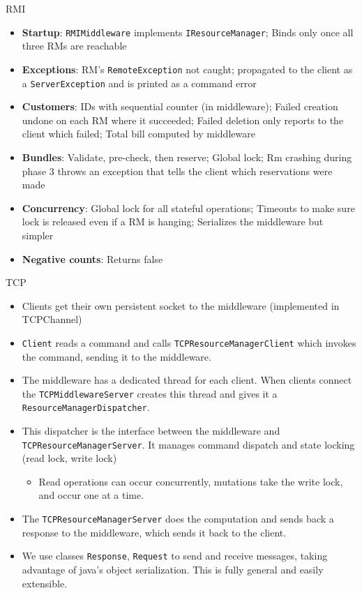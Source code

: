 \documentclass{beamer}
\begin{document}
\begin{frame}{RMI}
  \footnotesize
  \begin{itemize}
  \item \textbf{Startup}: \texttt{RMIMiddleware} implements
    \texttt{IResourceManager}; Binds only once all three RMs are reachable
  \item \textbf{Exceptions}: RM's \texttt{RemoteException} not caught;
    propagated to the client as a \texttt{ServerException} and is printed as a
    command error
  \item \textbf{Customers}: IDs with sequential counter (in middleware); Failed
    creation undone on each RM where it succeeded; Failed deletion only reports
    to the client which failed; Total bill computed by middleware
  \item \textbf{Bundles}: Validate, pre-check, then reserve; Global lock; Rm
    crashing during phase 3 throws an exception that tells the client which
    reservations were made
  \item \textbf{Concurrency}: Global lock for all stateful operations; Timeouts
    to make sure lock is released even if a RM is hanging; Serializes the
    middleware but simpler
  \item \textbf{Negative counts}: Returns false
  \end{itemize}
\end{frame}

\begin{frame}{TCP}
  \footnotesize
  \begin{itemize}
    \item Clients get their own persistent socket to the middleware (implemented in TCPChannel)
    \item \texttt{Client} reads a command and calls \texttt{TCPResourceManagerClient} which invokes the command, sending it to the middleware.
    \item The middleware has a dedicated thread for each client. When clients connect the \texttt{TCPMiddlewareServer} creates this thread and gives it a \texttt{ResourceManagerDispatcher}. 
    \item This dispatcher is the interface between the middleware and \texttt{TCPResourceManagerServer}. It manages command dispatch and state locking (read lock, write lock)
      \begin{itemize}
        \item Read operations can occur concurrently, mutations take the write lock, and occur one at a time.
      \end{itemize}
    \item The \texttt{TCPResourceManagerServer} does the computation and sends back a response to the middleware, which sends it back to the client.
    \item We use classes \texttt{Response}, \texttt{Request} to send and receive messages, taking advantage of java's object serialization. This is fully general and easily extensible.
  \end{itemize}
\end{frame}
\end{document}
